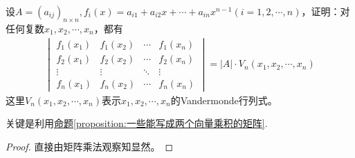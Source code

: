 \documentclass[../../main.tex]{subfiles}%
\begin{document}
\begin{proposition}\label{proposition:将矩阵拆分成Vandermode矩阵的形式}
设\(A = (a_{ij})_{n\times n},f_i(x)=a_{i1}+a_{i2}x+\cdots+a_{in}x^{n - 1}(i = 1,2,\cdots,n)\)，证明：对任何复数\(x_1,x_2,\cdots,x_n\)，都有
\begin{align*}
\begin{vmatrix}
f_1(x_1)&f_1(x_2)&\cdots&f_1(x_n)\\
f_2(x_1)&f_2(x_2)&\cdots&f_2(x_n)\\
\vdots&\vdots&\ddots&\vdots\\
f_n(x_1)&f_n(x_2)&\cdots&f_n(x_n)
\end{vmatrix}=|A|\cdot V_n(x_1,x_2,\cdots,x_n)
\end{align*}
这里\(V_n(x_1,x_2,\cdots,x_n)\)表示\(x_1,x_2,\cdots,x_n\)的Vandermonde行列式。
\end{proposition}
\begin{note}
关键是利用\hyperref[proposition:一些能写成两个向量乘积的矩阵]{命题\ref{proposition:一些能写成两个向量乘积的矩阵}}.
\end{note}
\begin{proof}
直接由矩阵乘法观察知显然。 
\end{proof}
\end{document}
